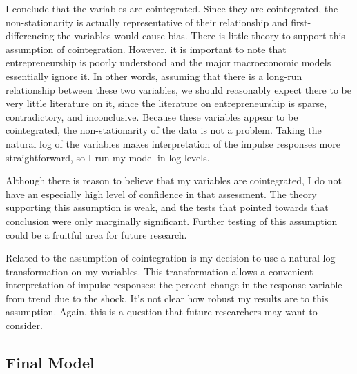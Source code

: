 \documentclass[]{ecca}
\begin{document}
I conclude that the variables are cointegrated.  Since they are cointegrated, the non-stationarity is actually representative of their relationship and first-differencing the variables would cause bias. There is little theory to support this assumption of cointegration. However, it is important to note that entrepreneurship is poorly understood and the major macroeconomic models essentially ignore it. In other words, assuming that there is a long-run relationship between these two variables, we should reasonably expect there to be very little literature on it, since the literature on entrepreneurship is sparse, contradictory, and inconclusive. Because these variables appear to be cointegrated, the non-stationarity of the data is not a problem. Taking the natural log of the variables makes interpretation of the impulse responses more straightforward, so I run my model in log-levels. 

Although there is reason to believe that my variables are cointegrated, I do not have an especially high level of confidence in that assessment. The theory supporting this assumption is weak, and the tests that pointed towards that conclusion were only marginally significant. Further testing of this assumption could be a fruitful area for future research.

Related to the assumption of cointegration is my decision to use a natural-log transformation on my variables. This transformation allows a convenient interpretation of impulse responses: the percent change in the response variable from trend due to the shock. It's not clear how robust my results are to this assumption. Again, this is a question that future researchers may want to consider.


\subsection{Final Model}
\end{document}
